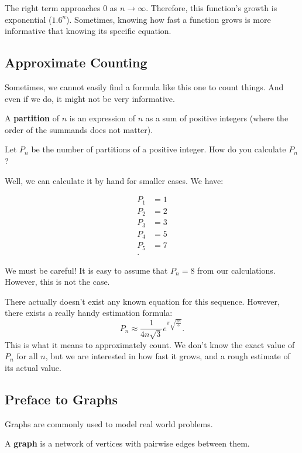 \documentclass[a4paper]{article}
\begin{document}
\begin{remark}
The right term approaches 0 as \( n \to \infty \). Therefore, this function's growth is exponential (\( 1.6^n \)). Sometimes, knowing how fast a function grows is more informative that knowing its specific equation.
\end{remark}

\subsection{Approximate Counting}
Sometimes, we cannot easily find a formula like this one to count things. And even if we do, it might not be very informative. 

\begin{definition}
	A \textbf{partition} of \( n \) is an expression of \( n \) as a sum of positive integers (where the order of the summands does not matter).
\end{definition}

\begin{eg}
	Let \( P_n \) be the number of partitions of a positive integer. How do you calculate \( P_n \)?
\end{eg}

Well, we can calculate it by hand for smaller cases. We have:

\begin{align*}
	P_1 &= 1 \\
	P_2 &= 2 \\
	P_3 &= 3 \\
	P_4 &= 5 \\
	P_5 &= 7 \\
.\end{align*}

\begin{note}
We must be careful! It is easy to assume that \( P_n = 8 \) from our calculations. However, this is not the case.
\end{note}

There actually doesn't exist any known equation for this sequence. However, there exists a really handy estimation formula:\[
	P_n \approx \frac{1}{4n\sqrt{3} }e^{\pi \sqrt{\frac{2n}{3} } }
.\] 
This is what it means to approximately count. We don't know the exact value of \( P_n \) for all \( n \), but we are interested in how fast it grows, and a rough estimate of its actual value.

\subsection{Preface to Graphs}
Graphs are commonly used to model real world problems.
\begin{definition}
	A \textbf{graph} is a network of vertices with pairwise edges between them.
\end{definition}
\end{document}
